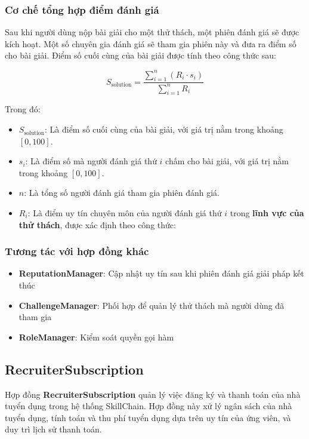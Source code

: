 \subsubsection{Cơ chế tổng hợp điểm đánh giá}

Sau khi người dùng nộp bài giải cho một thử thách, một phiên đánh giá sẽ được kích hoạt. Một số chuyên gia đánh giá sẽ tham gia phiên này và đưa ra điểm số cho bài giải. Điểm số cuối cùng của bài giải được tính theo công thức sau:

\[
  S_{\text{solution}}= \frac{\displaystyle\sum_{i=1}^{n} (R_{i} \cdot s_{i})}{\displaystyle\sum_{i=1}^{n} R_{i}}
\]

Trong đó:

\begin{itemize}
  \item $S_{\text{solution}}$: Là điểm số cuối cùng của bài giải, với giá trị nằm trong khoảng $[0, 100]$.
  \item $s_{i}$: Là điểm số mà người đánh giá thứ $i$ chấm cho bài giải, với giá trị nằm trong khoảng $[0, 100]$.
  \item $n$: Là tổng số người đánh giá tham gia phiên đánh giá.
  \item $R_{i}$: Là điểm uy tín chuyên môn của người đánh giá thứ $i$ trong \textbf{lĩnh vực của thử thách}, được xác định theo công thức:
\end{itemize}

\subsubsection{Tương tác với hợp đồng khác}

\begin{itemize}
  \item \textbf{ReputationManager}: Cập nhật uy tín sau khi phiên đánh giá giải pháp kết thúc
  \item \textbf{ChallengeManager}: Phối hợp để quản lý thử thách mà người dùng đã tham gia
  \item \textbf{RoleManager}: Kiểm soát quyền gọi hàm
\end{itemize}

\subsection{RecruiterSubscription}

Hợp đồng \textbf{RecruiterSubscription} quản lý việc đăng ký và thanh toán của nhà tuyển dụng trong hệ thống SkillChain.
Hợp đồng này xử lý ngân sách của nhà tuyển dụng, tính toán và thu phí tuyển dụng dựa trên uy tín của ứng viên, và duy trì lịch sử thanh toán.

